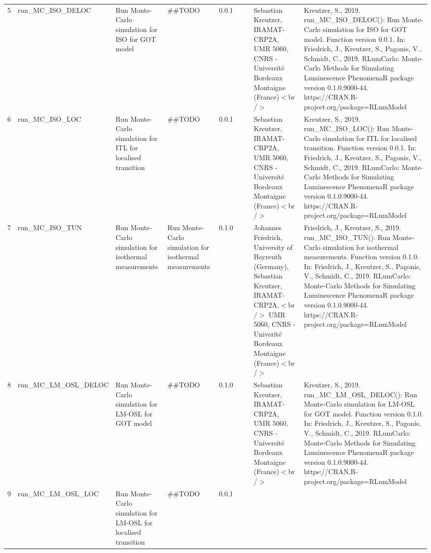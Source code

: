 \begin{table}[ht]
\begin{tabular}{rllllllll}
 \\ 
  5 & run\_MC\_ISO\_DELOC & Run Monte-Carlo simulation for ISO for GOT model & \#\#TODO & 0.0.1
 &  &  & Sebastian Kreutzer, IRAMAT-CRP2A, UMR 5060, CNRS - Université Bordeaux Montaigne (France)$<$br /$>$ & Kreutzer, S., 2019. run\_MC\_ISO\_DELOC(): Run Monte-Carlo simulation for ISO for GOT model. Function version 0.0.1. In: Friedrich, J., Kreutzer, S., Pagonis, V., Schmidt, C., 2019. RLumCarlo: Monte-Carlo Methods for Simulating Luminescence PhenomenaR package version 0.1.0.9000-44. https://CRAN.R-project.org/package=RLumModel
 \\ 
  6 & run\_MC\_ISO\_LOC & Run Monte-Carlo simulation for ITL for localised transition & \#\#TODO & 0.0.1
 &  &  & Sebastian Kreutzer, IRAMAT-CRP2A, UMR 5060, CNRS - Université Bordeaux Montaigne (France)$<$br /$>$ & Kreutzer, S., 2019. run\_MC\_ISO\_LOC(): Run Monte-Carlo simulation for ITL for localised transition. Function version 0.0.1. In: Friedrich, J., Kreutzer, S., Pagonis, V., Schmidt, C., 2019. RLumCarlo: Monte-Carlo Methods for Simulating Luminescence PhenomenaR package version 0.1.0.9000-44. https://CRAN.R-project.org/package=RLumModel
 \\ 
  7 & run\_MC\_ISO\_TUN & Run Monte-Carlo simulation for isothermal measurements & Run Monte-Carlo simulation for isothermal measurements & 0.1.0
 &  &  & Johannes Friedrich, University of Bayreuth (Germany), Sebastian Kreutzer, IRAMAT-CRP2A,$<$br /$>$ UMR 5060, CNRS - Univerité Bordeaux Montaigne (France)$<$br /$>$ & Friedrich, J., Kreutzer, S., 2019. run\_MC\_ISO\_TUN(): Run Monte-Carlo simulation for isothermal measurements. Function version 0.1.0. In: Friedrich, J., Kreutzer, S., Pagonis, V., Schmidt, C., 2019. RLumCarlo: Monte-Carlo Methods for Simulating Luminescence PhenomenaR package version 0.1.0.9000-44. https://CRAN.R-project.org/package=RLumModel
 \\ 
  8 & run\_MC\_LM\_OSL\_DELOC & Run Monte-Carlo simulation for LM-OSL for GOT model & \#\#TODO & 0.1.0
 &  &  & Sebastian Kreutzer, IRAMAT-CRP2A, UMR 5060, CNRS - Université Bordeaux Montaigne (France)$<$br /$>$ & Kreutzer, S., 2019. run\_MC\_LM\_OSL\_DELOC(): Run Monte-Carlo simulation for LM-OSL for GOT model. Function version 0.1.0. In: Friedrich, J., Kreutzer, S., Pagonis, V., Schmidt, C., 2019. RLumCarlo: Monte-Carlo Methods for Simulating Luminescence PhenomenaR package version 0.1.0.9000-44. https://CRAN.R-project.org/package=RLumModel
 \\ 
  9 & run\_MC\_LM\_OSL\_LOC & Run Monte-Carlo simulation for LM-OSL for localised transition & \#\#TODO & 0.0.1

\end{tabular}
\end{table}
